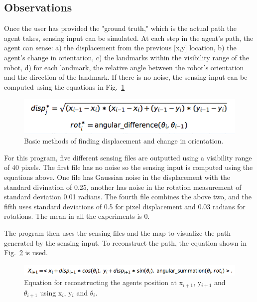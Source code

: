 \documentclass[a4paper,11pt]{report}
\begin{document}
	\subsection{Observations}
	Once the user has provided the "ground truth," which is the actual path the agent takes, sensing input can be simulated. At each step in the agent's path, the agent can sense: a) the displacement from the previous [x,y] location, b) the agent's change in orientation, c) the landmarks within the visibility range of the robot, d) for each landmark, the relative angle between the robot's orientation and the direction of the landmark. If there is no noise, the sensing input can be computed using the equations in Fig.~\ref{fig:equations}
	
	\begin{figure}[h!]
	  \centering
	    \includegraphics[width=.7\textwidth]{images/equations.png}
	  \caption{Basic methods of finding displacement and change in orientation.}
	  \label{fig:equations}
	\end{figure}
	
	For this program, five different sensing files are outputted using a visibility range of 40 pixels. The first file has no noise so the sensing input is computed using the equations above. One file has Gaussian noise in the displacement with the standard divination of 0.25, another has noise in the rotation measurement of standard deviation 0.01 radians. The fourth file combines the above two, and the fifth uses standard deviations of 0.5 for pixel displacement and 0.03 radians for rotations. The mean in all the experiments is 0.
	

	
	The program then uses the sensing files and the map to visualize the path generated by the sensing input. To reconstruct  the path, the equation shown in Fig.~\ref{fig:equation_2} is used. 
	\begin{figure}[h!]
	  \centering
	    \includegraphics[width=1\textwidth]{images/equation_2.png}
	  \caption{Equation for reconstructing the agents position at x$_{i+1}$,  y$_{i+1}$ and  $\theta_{i+1}$ using  x$_{i}$, y$_{i}$ and $\theta_{i}$.}
	  \label{fig:equation_2}
	\end{figure}
		
\end{document}
